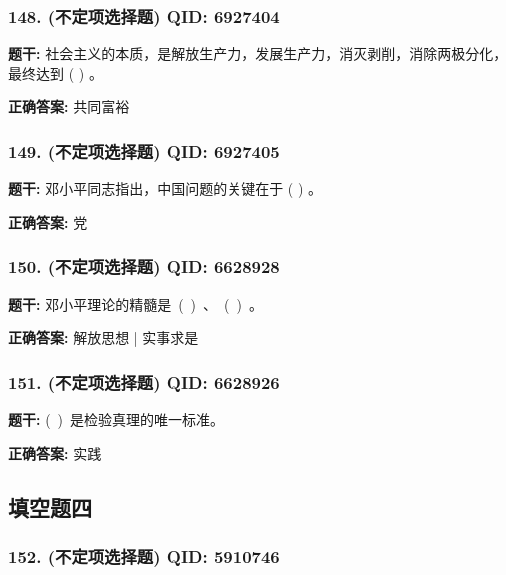 \documentclass[12pt,UTF8]{ctexart}
\begin{document}
\subsubsection*{148. (不定项选择题) \small QID: 6927404}

\textbf{题干:}
社会主义的本质，是解放生产力，发展生产力，消灭剥削，消除两极分化，最终达到 ( ) 。

\textbf{正确答案:}
共同富裕

\vspace{0.3em}\hrulefill\vspace{0.7em}

\subsubsection*{149. (不定项选择题) \small QID: 6927405}

\textbf{题干:}
邓小平同志指出，中国问题的关键在于 ( ) 。

\textbf{正确答案:}
党

\vspace{0.3em}\hrulefill\vspace{0.7em}

\subsubsection*{150. (不定项选择题) \small QID: 6628928}

\textbf{题干:}
邓小平理论的精髓是 ( ) 、 ( ) 。

\textbf{正确答案:}
解放思想 | 实事求是

\vspace{0.3em}\hrulefill\vspace{0.7em}

\subsubsection*{151. (不定项选择题) \small QID: 6628926}

\textbf{题干:}
( ) 是检验真理的唯一标准。

\textbf{正确答案:}
实践

\vspace{0.3em}\hrulefill\vspace{0.7em}

\subsection*{填空题四}

\subsubsection*{152. (不定项选择题) \small QID: 5910746}
\end{document}
